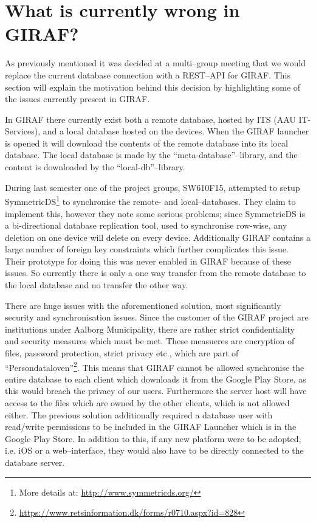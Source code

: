 \section{What is currently wrong in GIRAF?} \label{sec:current} %
As previously mentioned it was decided at a multi--group meeting that we would replace the current database connection with a REST--API for GIRAF.
This section will explain the motivation behind this decision by highlighting some of the issues currently present in GIRAF.

In GIRAF there currently exist both a remote database, hosted by ITS (AAU IT-Services), and a local database hosted on the devices.
When the GIRAF launcher is opened it will download the contents of the remote database into its local database.
The local database is made by the ``meta-database''--library, and the content is downloaded by the ``local-db''--library.

During last semester one of the project groups, SW610F15, attempted to setup SymmetricDS\footnote{More details at: \url{http://www.symmetricds.org/}} to synchronise the remote- and local--databases.
They claim to implement this, however they note some serious problems; since SymmetricDS is a bi-directional database replication tool, used to synchronise row-wise, any deletion on one device will delete on every device.
Additionally GIRAF contains a large number of foreign key constraints which further complicates this issue.
Their prototype for doing this was never enabled in GIRAF because of these issues.
So currently there is only a one way transfer from the remote database to the local database and no transfer the other way.

\bigskip
There are huge issues with the aforementioned solution, most significantly security and synchronisation issues.
Since the customer of the GIRAF project are institutions under Aalborg Municipality, there are rather strict confidentiality and security measures which must be met.
These measueres are encryption of files, password protection, strict privacy etc., which are part of ``Persondataloven''\footnote{\url{https://www.retsinformation.dk/forms/r0710.aspx?id=828}}.
This means that GIRAF cannot be allowed synchronise the entire database to each client which downloads it from the Google Play Store, as this would breach the privacy of our users.
Furthermore the server host will have access to the files which are owned by the other clients, which is not allowed either.
The previous solution additionally required a database user with read/write permissions to be included in the GIRAF Launcher which is in the Google Play Store.
In addition to this, if any new platform were to be adopted, i.e. iOS or a web--interface, they would also have to be directly connected to the database server.

